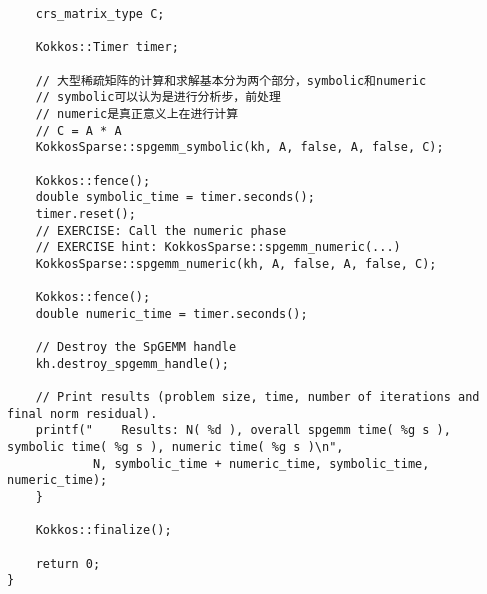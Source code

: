 \begin{lstlisting}
    crs_matrix_type C;

    Kokkos::Timer timer;

    // 大型稀疏矩阵的计算和求解基本分为两个部分，symbolic和numeric
    // symbolic可以认为是进行分析步，前处理
    // numeric是真正意义上在进行计算
    // C = A * A
    KokkosSparse::spgemm_symbolic(kh, A, false, A, false, C);

    Kokkos::fence();
    double symbolic_time = timer.seconds();
    timer.reset();
    // EXERCISE: Call the numeric phase
    // EXERCISE hint: KokkosSparse::spgemm_numeric(...)
    KokkosSparse::spgemm_numeric(kh, A, false, A, false, C);

    Kokkos::fence();
    double numeric_time = timer.seconds();

    // Destroy the SpGEMM handle
    kh.destroy_spgemm_handle();

    // Print results (problem size, time, number of iterations and final norm residual).
    printf("    Results: N( %d ), overall spgemm time( %g s ), symbolic time( %g s ), numeric time( %g s )\n",
            N, symbolic_time + numeric_time, symbolic_time, numeric_time);
    }

    Kokkos::finalize();

    return 0;
}
\end{lstlisting}